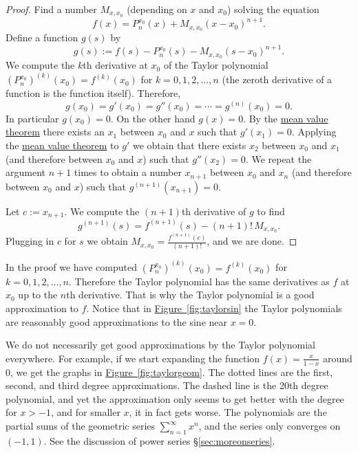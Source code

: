 \documentclass[12pt]{book}
\theoremstyle{plain}
\theoremstyle{remark}
\theoremstyle{definition}
\theoremstyle{exercise}
\theoremstyle{example}
\newcommand{\figureref}[1]{\hyperref[#1]{Figure~\ref*{#1}}}
\newcommand{\sectionref}[1]{\hyperref[#1]{\S\ref*{#1}}}
\begin{document}
\begin{proof}
Find a number $M_{x,x_0}$ (depending on $x$ and $x_0$) solving the equation
\begin{equation*}
f(x)=P_{n}^{x_0}(x)+M_{x,x_0}{(x-x_0)}^{n+1} .
\end{equation*}
Define a function $g(s)$ by
\begin{equation*}
g(s) := f(s)-P_n^{x_0}(s)-M_{x,x_0}{(s-x_0)}^{n+1} .
\end{equation*}
We compute
the $k$th derivative at $x_0$ of the Taylor polynomial
${(P_n^{x_0})}^{(k)}(x_0) = f^{(k)}(x_0)$ for
$k=0,1,2,\ldots,n$ (the zeroth derivative of a function is the function
itself).  Therefore,
\begin{equation*}
g(x_0) = g'(x_0) = g''(x_0) = \cdots = g^{(n)}(x_0) = 0 .
\end{equation*}
In particular $g(x_0) = 0$.
On the other hand $g(x) = 0$.  By the
\hyperref[thm:mvt]{mean value theorem}
there exists an $x_1$ between $x_0$ and $x$ such that $g'(x_1) = 0$.
Applying the \hyperref[thm:mvt]{mean value theorem}
to $g'$ we obtain that there exists
$x_2$ between $x_0$ and $x_1$ (and therefore between $x_0$ and $x$)
such that $g''(x_2) = 0$.  We repeat the
argument $n+1$ times to obtain a number $x_{n+1}$ between $x_0$ and $x_n$
(and therefore between $x_0$ and $x$) such that $g^{(n+1)}(x_{n+1}) = 0$.

Let $c:=x_{n+1}$.
We compute the $(n+1)$th derivative of $g$ to find
\begin{equation*}
g^{(n+1)}(s) = f^{(n+1)}(s)-(n+1)!\,M_{x,x_0} .
\end{equation*}
Plugging in $c$ for $s$ we obtain $M_{x,x_0} = \frac{f^{(n+1)}(c)}{(n+1)!}$, and
we are done.
\end{proof}

In the proof we have computed 
${(P_n^{x_0})}^{(k)}(x_0) = f^{(k)}(x_0)$ for $k=0,1,2,\ldots,n$.
Therefore the Taylor polynomial has the same derivatives as $f$ at $x_0$
up to the $n$th derivative.  That is why the Taylor polynomial is
a good approximation to $f$.
Notice that in \figureref{fig:taylorsin} the Taylor polynomials are
reasonably good approximations to the sine near $x=0$.

We do not necessarily get good approximations
by the Taylor polynomial everywhere.
For example, if we start expanding the function $f(x) =
\frac{x}{1-x}$ around 0, we get the graphs in
\figureref{fig:taylorgeom}.  The dotted lines are the first, second, and
third degree approximations.  The dashed line is
the 20th degree polynomial, and yet the approximation only seems to get
better with the degree for $x > -1$, and for smaller $x$, it in fact gets worse.
The polynomials
are the partial sums of the geometric series $\sum_{n=1}^\infty x^n$,
and the series only converges on $(-1,1)$.
See the discussion of power series
\sectionref{sec:moreonseries}.
\end{document}
